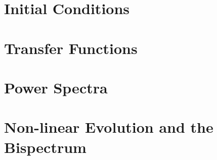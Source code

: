 %
%

\section{Initial Conditions}

\section{Transfer Functions}

\section{Power Spectra}

\section{Non-linear Evolution and the Bispectrum}